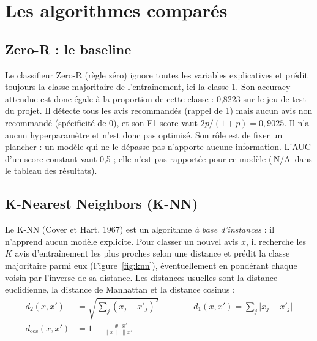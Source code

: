 \documentclass[11pt,a4paper]{report}
\def\og{\guillemotleft\nobreak\,}%
\def\fg{\unskip\nobreak\,\guillemotright}%
\newcommand{\gl}[1]{\og #1\fg{}}       %
\numberwithin{equation}{chapter}
\begin{document}
\section{Les algorithmes comparés}\label{sec:algos}
\subsection{Zero-R : le baseline}
Le classifieur Zero-R (règle zéro) ignore toutes les variables explicatives et prédit toujours la classe majoritaire de l'entraînement, ici la classe 1. Son accuracy attendue est donc égale à la proportion de cette classe : 0,8223 sur le jeu de test du projet. Il détecte tous les avis recommandés (rappel de 1) mais aucun avis non recommandé (spécificité de 0), et son F1-score vaut $2p/(1 + p) = 0{,}9025$. Il n'a aucun hyperparamètre et n'est donc pas optimisé. Son rôle est de fixer un plancher : un modèle qui ne le dépasse pas n'apporte aucune information. L'AUC d'un score constant vaut 0,5 ; elle n'est pas rapportée pour ce modèle (\gl{N/A} dans le tableau des résultats).

\subsection{K-Nearest Neighbors (K-NN)}
Le K-NN (Cover et Hart, 1967) est un algorithme \textit{à base d'instances} : il n'apprend aucun modèle explicite. Pour classer un nouvel avis $x$, il recherche les $K$ avis d'entraînement les plus proches selon une distance et prédit la classe majoritaire parmi eux (Figure~\ref{fig:knn}), éventuellement en pondérant chaque voisin par l'inverse de sa distance. Les distances usuelles sont la distance euclidienne, la distance de Manhattan et la distance cosinus :
\begin{align}
d_2(x,x') &= \sqrt{\sum_j (x_j - x'_j)^2} \qquad\qquad d_1(x,x') = \sum_j \lvert x_j - x'_j\rvert \label{eq:dist}\\
d_{\cos}(x,x') &= 1 - \frac{x\cdot x'}{\lVert x\rVert\,\lVert x'\rVert} \label{eq:cosinus}
\end{align}
\end{document}
